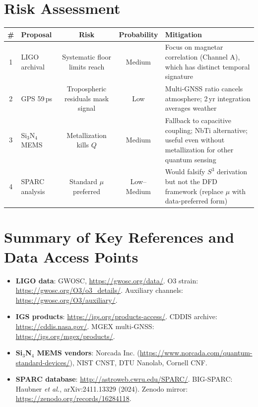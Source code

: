 \documentclass[11pt]{article}
\begin{document}
\section{Risk Assessment}

\begin{center}
\renewcommand{\arraystretch}{1.25}
\begin{tabular}{@{}clccp{5cm}@{}}
\toprule
\textbf{\#} & \textbf{Proposal} & \textbf{Risk} & \textbf{Probability} &
  \textbf{Mitigation} \\
\midrule
1 & LIGO archival & Systematic floor limits reach &
  Medium & Focus on magnetar correlation (Channel A), which has
  distinct temporal signature \\
2 & GPS 59\,ps & Tropospheric residuals mask signal &
  Low & Multi-GNSS ratio cancels atmosphere; 2\,yr integration
  averages weather \\
3 & Si$_3$N$_4$ MEMS & Metallization kills $Q$ &
  Medium & Fallback to capacitive coupling; NbTi alternative;
  useful even without metallization for other quantum sensing \\
4 & SPARC analysis & Standard $\mu$ preferred &
  Low--Medium & Would falsify $S^3$ derivation but not the DFD
  framework (replace $\mu$ with data-preferred form) \\
\bottomrule
\end{tabular}
\end{center}


\section*{Summary of Key References and Data Access Points}

\begin{itemize}[nosep]
\item \textbf{LIGO data}: GWOSC, \url{https://gwosc.org/data/}.
  O3 strain: \url{https://gwosc.org/O3/o3_details/}.
  Auxiliary channels: \url{https://gwosc.org/O3/auxiliary/}.
\item \textbf{IGS products}: \url{https://igs.org/products-access/}.
  CDDIS archive: \url{https://cddis.nasa.gov/}.
  MGEX multi-GNSS: \url{https://igs.org/mgex/products/}.
\item \textbf{Si$_3$N$_4$ MEMS vendors}: Norcada Inc.
  (\url{https://www.norcada.com/quantum-standard-devices/}),
  NIST CNST, DTU Nanolab, Cornell CNF.
\item \textbf{SPARC database}: \url{http://astroweb.cwru.edu/SPARC/}.
  BIG-SPARC: Haubner \textit{et al.}, arXiv:2411.13329 (2024).
  Zenodo mirror: \url{https://zenodo.org/records/16284118}.
\end{itemize}
\end{document}
